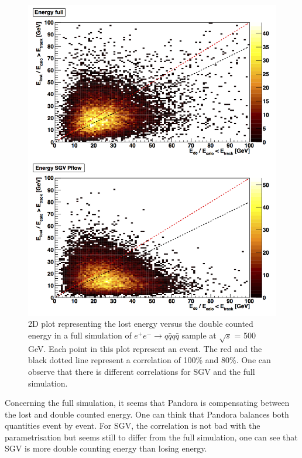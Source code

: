 \begin{figure}[t]
  \centering
  \includegraphics[scale=0.4]{chap6/fig_SGV/Correlation_nojet.png}
  \caption{2D plot representing the lost energy versus the double counted energy in a full simulation of $e^+e^- \rightarrow q\bar{q} q\bar{q}$ sample at $\sqrt{s}$ = 500 GeV. Each point in this plot represent an event. The red and the black dotted line represent a correlation of 100\% and 80\%. One can observe that there is different correlations for SGV and the full simulation.}
  \label{fig:cluster_track_level}
\end{figure}

Concerning the full simulation, it seems that Pandora is compensating between the lost and double counted energy. One can think that Pandora balances both quantities event by event. For SGV, the correlation is not bad with the parametrisation but seems still to differ from the full simulation, one can see that SGV is more double counting energy than losing energy.

